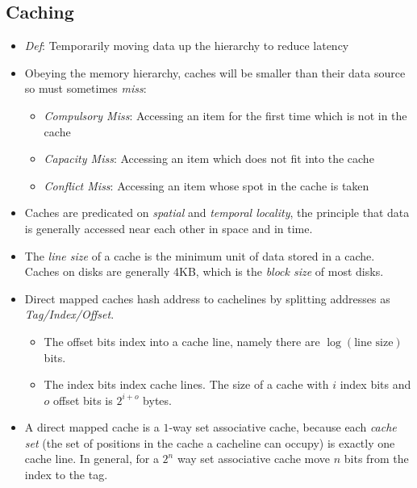 \documentclass[12pt]{article}
\begin{document}
\subsection{Caching}
\begin{itemize}
	\item \textit{Def}: Temporarily moving data up the hierarchy to reduce latency
	\item Obeying the memory hierarchy, caches will be smaller than their data source so must sometimes \textit{miss}:
		\begin{itemize}
			\item \textit{Compulsory Miss}: Accessing an item for the first time which is not in the cache
			\item \textit{Capacity Miss}: Accessing an item which does not fit into the cache
			\item \textit{Conflict Miss}: Accessing an item whose spot in the cache is taken
		\end{itemize}
	\item Caches are predicated on \textit{spatial} and \textit{temporal locality}, the principle that data is generally accessed near each other in space and in time. 
	\item The \textit{line size} of a cache is the minimum unit of data stored in a cache. Caches on disks are generally 4KB, which is the \textit{block size} of most disks. 
	\item Direct mapped caches hash address to cachelines by splitting addresses as \textit{Tag/Index/Offset}. 
		\begin{itemize}
			\item The offset bits index into a cache line, namely there are $\log(\textrm{line size})$ bits.
			\item The index bits index cache lines. The size of a cache with $i$ index bits and $o$ offset bits is $2^{i+o}$ bytes. 
		\end{itemize}
	\item A direct mapped cache is a $1$-way set associative cache, because each \textit{cache set} (the set of positions in the cache a cacheline can occupy) is exactly one cache line. In general, for a $2^{n}$ way set associative cache move $n$ bits from the index to the tag. \\
\end{itemize}
\newpage
\end{document}
